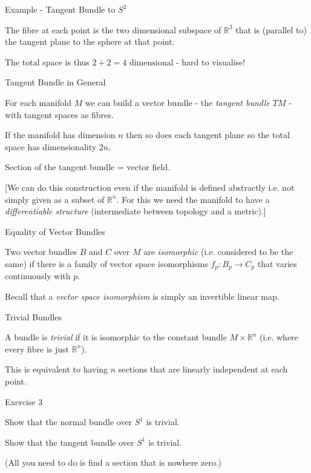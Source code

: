 \documentclass{beamer}
\begin{document}
\begin{frame}{Example - Tangent Bundle to $S^2$}

The fibre at each point is the two dimensional subspace of $\mathbb{R}^3$ that is (parallel to) the tangent plane to the sphere at that point.

The total space is thus $2 + 2 = 4 \text{ dimensional}$ - hard to visualise!

\end{frame}


\begin{frame}{Tangent Bundle in General}

For each manifold $M$ we can build a vector bundle - the \textit{tangent bundle $TM$} - with tangent spaces as fibres.

If the manifold has dimension $n$ then so does each tangent plane so the total space has dimensionality $2n$.

Section of the tangent bundle  = vector field.

[We can do this construction even if the manifold is defined abstractly i.e. not simply given as a subset of $\mathbb{R}^n$. For this we need the manifold to have a \textit{differentiable structure} (intermediate between topology and a metric).]



\end{frame}

\begin{frame}{Equality of Vector Bundles}

Two vector bundles $B$ and $C$ over $M$ are \textit{isomorphic} (i.e. considered to be the same) if there is a family of vector space isomorphisms $f_p \colon B_p \to C_p$ that varies continuously with $p$.

Recall that a \textit{vector space isomorphism} is simply an invertible linear map.

\end{frame}

\begin{frame}{Trivial Bundles}

A bundle is \textit{trivial} if it is isomorphic to the constant bundle $M \times \mathbb{R}^n$ (i.e. where every fibre is just $\mathbb{R}^n$).

This is equivalent to having $n$ sections that are linearly independent at each point.

\end{frame}

\begin{frame}{Exercise 3}

Show that the normal bundle over $S^1$ is trivial.

Show that the tangent bundle over $S^1$ is trivial.

(All you need to do is find a section that is nowhere zero.)

\end{frame}
\end{document}
